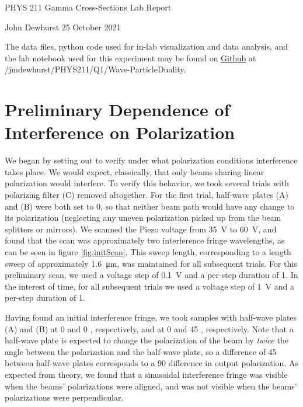 \documentclass[letter]{article}
\begin{document}

\begin{center}
	{\large PHYS 211 Gamma Cross-Sections Lab Report}
	
	John Dewhurst \hspace{1cm}
	25 October 2021
	
	\vspace{1em}
	
	The data files, python code used for in-lab visualization and data analysis, and the lab notebook used for this experiment may be found on \href{https://github.com/jmdewhurst/PHYS211.git}{Github} at /jmdewhurst/PHYS211/Q1/Wave-ParticleDuality.
	
	\vspace{1em}
\end{center}
	


\section{Preliminary Dependence of Interference on Polarization}

We began by setting out to verify under what polarization conditions interference takes place. We would expect, classically, that only beams sharing linear polarization would interfere. To verify this behavior, we took several trials with polarizing filter (C) removed altogether. For the first trial, half-wave plates (A) and (B) were both set to \qty{0}{\deg}, so that neither beam path would have any change to its polarization (neglecting any uneven polarization picked up from the beam splitters or mirrors). We scanned the Piezo voltage from \qty{35}{\volt} to \qty{60}{\volt}, and found that the scan was approximately two interference fringe wavelengths, as can be seen in figure \ref{fig:initScan}. This sweep length, corresponding to a length sweep of approximately \qty{1.6}{\um}, was maintained for all subsequent trials. For this preliminary scan, we used a voltage step of \qty{0.1}{\volt} and a per-step duration of \qty{1}{\sec}. In the interest of time, for all subsequent trials we used a voltage step of \qty{1}{\volt} and a per-step duration of \qty{1}{\sec}.

Having found an initial interference fringe, we took samples with half-wave plates (A) and (B) at 0 and 0 \unit{\deg}, respectively, and at 0 and 45 \unit{\deg}, respectively. Note that a half-wave plate is expected to change the polarization of the beam by \textit{twice} the angle between the polarization and the half-wave plate, so a difference of \qty{45}{\deg} between half-wave plates corresponds to a \qty{90}{\deg} difference in output polarization. As expected from theory, we found that a sinusoidal interference fringe was visible when the beams' polarizations were aligned, and was not visible when the beams' polarizations were perpendicular.
\end{document}
